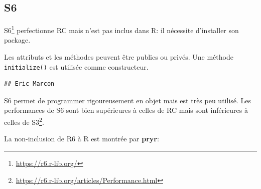 \documentclass[
  12pt,
  french,
  a4paper,
  extrafontsizes,onecolumn,openright
  ]{memoir}
\newenvironment{Shaded}{\begin{snugshade}}{\end{snugshade}}
\newcommand{\ControlFlowTok}[1]{\textcolor[rgb]{0.13,0.29,0.53}{\textbf{#1}}}
\newcommand{\DataTypeTok}[1]{\textcolor[rgb]{0.13,0.29,0.53}{#1}}
\newcommand{\KeywordTok}[1]{\textcolor[rgb]{0.13,0.29,0.53}{\textbf{#1}}}
\newcommand{\NormalTok}[1]{#1}
\newcommand{\OperatorTok}[1]{\textcolor[rgb]{0.81,0.36,0.00}{\textbf{#1}}}
\newcommand{\OtherTok}[1]{\textcolor[rgb]{0.56,0.35,0.01}{#1}}
\newcommand{\StringTok}[1]{\textcolor[rgb]{0.31,0.60,0.02}{#1}}
\newlength{\rf}
\begin{document}
\hypertarget{s6}{%
\subsection{S6}\label{s6}}

S6\footnote{\url{https://r6.r-lib.org/}} perfectionne RC mais n'est pas inclus dans R: il nécessite d'installer son package.

Les attributs et les méthodes peuvent être publics ou privés.
Une méthode \texttt{initialize()} est utilisée comme constructeur.

\scriptsize

\begin{Shaded}
\end{Shaded}

\begin{verbatim}
## Eric Marcon
\end{verbatim}

\normalsize

S6 permet de programmer rigoureusement en objet mais est très peu utilisé.
Les performances de S6 sont bien supérieures à celles de RC mais sont inférieures à celles de S3\footnote{\url{https://r6.r-lib.org/articles/Performance.html}}.

La non-inclusion de R6 à R est montrée par \textbf{pryr}:
\end{document}

